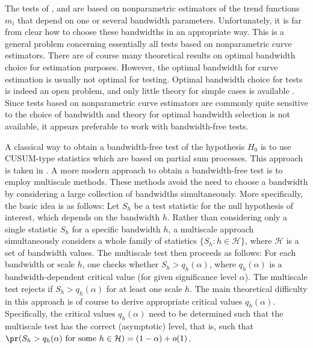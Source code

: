 The tests of \cite{Zhang2012}, \cite{DegrasWu2012} and \cite{ChenWu2018} are based on nonparametric estimators of the trend functions $m_i$ that depend on one or several bandwidth parameters. Unfortunately, it is far from clear how to choose these bandwidths in an appropriate way. This is a general problem concerning essentially all tests based on nonparametric curve estimators. There are of course many theoretical results on optimal bandwidth choice for estimation purposes. However, the optimal bandwidth for curve estimation is usually not optimal for testing. Optimal bandwidth choice for tests is indeed an open problem, and only little theory for simple cases is available \citep[cp.][]{GaoGijbels2008}. Since tests based on nonparametric curve estimators are commonly quite sensitive to the choice of bandwidth and theory for optimal bandwidth selection is not available, it appears preferable to work with bandwidth-free tests. 


A classical way to obtain a bandwidth-free test of the hypothesis $H_0$ is to use CUSUM-type statistics which are based on partial sum processes. This approach is taken in \cite{Hidalgo2014}. A more modern approach to obtain a bandwidth-free test is to employ multiscale methods. These methods avoid the need to choose a bandwidth by considering a large collection of bandwidths simultaneously. More specifically, the basic idea is as follows: Let $S_h$ be a test statistic for the null hypothesis of interest, which depends on the bandwidth $h$. Rather than considering only a single statistic $S_h$ for a specific bandwidth $h$, a multiscale approach simultaneously considers a whole family of statistics $\{S_h: h \in \mathcal{H} \}$, where $\mathcal{H}$ is a set of bandwidth values. The multiscale test then proceeds as follows: For each bandwidth or scale $h$, one checks whether $S_h > q_h(\alpha)$, where $q_h(\alpha)$ is a bandwidth-dependent critical value (for given significance level $\alpha$). The multiscale test rejects if $S_h > q_h(\alpha)$ for at least one scale $h$. The main theoretical difficulty in this approach is of course to derive appropriate critical values $q_h(\alpha)$. Specifically, the critical values $q_h(\alpha)$ need to be determined such that the multiscale test has the correct (asymptotic) level, that is, such that $\pr (S_h > q_h(\alpha) \text{ for some } h \in \mathcal{H} ) = (1-\alpha) + o(1)$. 


